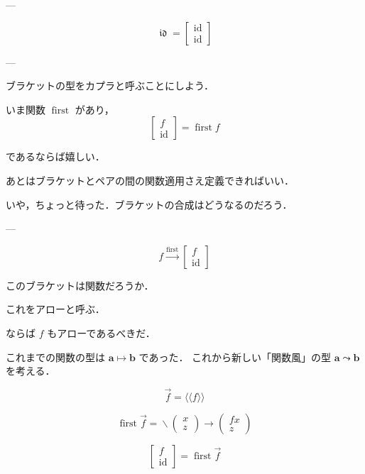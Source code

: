 \documentclass[a5paper,twoside,fleqn,draft]{jsbook}
\newcommand{\Langle}{\langle\!\langle}
\newcommand{\Rangle}{\rangle\!\rangle}
\newcommand{\mSpecialFunc}[1]{#1}
\newcommand{\mVarSpecialFunc}[1]{\mathfrak{#1}}
\DeclareMathOperator{\mFirst}{\mSpecialFunc{first}}
\DeclareMathOperator{\mId}{\mSpecialFunc{id}}
\DeclareMathOperator{\mIdCat}{\mVarSpecialFunc{id}}
\DeclareMathOperator{\mLambda}{\backslash}
\DeclareMathOperator{\mLambdaArrow}{\rightarrow}
\DeclareMathOperator{\mMapsTo}{\mapsto}
\newcommand{\mType}[1]{\mathbf{#1}} %
\newcommand{\mA}{\mType{a}}
\newcommand{\mB}{\mType{b}}
\newcommand{\mArrowWith}[1]{\Langle#1\Rangle}
\newcommand{\mPairWith}[2]{\begin{pmatrix}#1\\#2\end{pmatrix}}
\begin{document}
---

\begin{equation}
  \mIdCat
  =
  \begin{bmatrix}
    \mId\\
    \mId
  \end{bmatrix}
\end{equation}

---

ブラケットの型をカプラと呼ぶことにしよう．

いま関数 $\mFirst$ があり，
\begin{equation}
  \begin{bmatrix}
    f\\
    \mId
  \end{bmatrix}
  =\mFirst f
\end{equation}


であるならば嬉しい．

あとはブラケットとペアの間の関数適用さえ定義できればいい．

いや，ちょっと待った．ブラケットの合成はどうなるのだろう．

---

\begin{equation}
  f
  \xrightarrow{\mFirst}
  \begin{bmatrix}
    f\\
    \mId
  \end{bmatrix}
\end{equation}

このブラケットは関数だろうか．

これをアローと呼ぶ．

ならば $f$ もアローであるべきだ．

これまでの関数の型は $\mA\mMapsTo\mB$ であった．
これから新しい「関数風」の型 $\mA\leadsto\mB$ を考える．

\begin{equation}
  \Vec{f}
  =\mArrowWith{f}
\end{equation}

\begin{equation}
  \mFirst\Vec{f}
  =\mLambda{\mPairWith{x}{z}}\mLambdaArrow\mPairWith{fx}{z}
\end{equation}

\begin{equation}
  \begin{bmatrix}
    f\\
    \mId
  \end{bmatrix}
  =\mFirst\Vec{f}
\end{equation}
\end{document}
